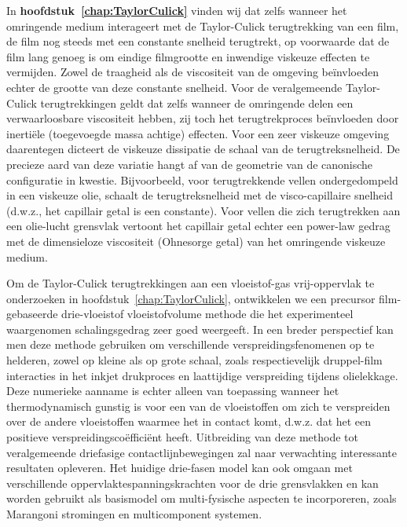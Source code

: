 In \textbf{hoofdstuk~\ref{chap:TaylorCulick}} vinden wij dat zelfs wanneer het omringende medium interageert met de Taylor-Culick terugtrekking van een film, de film nog steeds met een constante snelheid terugtrekt, op voorwaarde dat de film lang genoeg is om eindige filmgrootte en inwendige viskeuze effecten te vermijden.  Zowel de traagheid als de viscositeit van de omgeving beïnvloeden echter de grootte van deze constante snelheid. Voor de veralgemeende Taylor-Culick terugtrekkingen geldt dat zelfs wanneer de omringende delen een verwaarloosbare viscositeit hebben, zij toch het terugtrekproces beïnvloeden door inerti{\"e}le (toegevoegde massa achtige) effecten. Voor een zeer viskeuze omgeving daarentegen dicteert de viskeuze dissipatie de schaal van de terugtreksnelheid. De precieze aard van deze variatie hangt af van de geometrie van de canonische configuratie in kwestie. Bijvoorbeeld, voor terugtrekkende vellen ondergedompeld in een viskeuze olie, schaalt de terugtreksnelheid met de visco-capillaire snelheid (d.w.z., het capillair getal is een constante). Voor vellen die zich terugtrekken aan een olie-lucht grensvlak vertoont het capillair getal echter een power-law gedrag met de dimensieloze viscositeit (Ohnesorge getal) van het omringende viskeuze medium.

Om de Taylor-Culick terugtrekkingen aan een vloeistof-gas vrij-oppervlak te onderzoeken in hoofdstuk~\ref{chap:TaylorCulick}, ontwikkelen we een precursor film-gebaseerde drie-vloeistof vloeistofvolume methode die het experimenteel waargenomen schalingsgedrag zeer goed weergeeft. In een breder perspectief kan men deze methode gebruiken om verschillende verspreidingsfenomenen op te helderen, zowel op kleine als op grote schaal, zoals respectievelijk druppel-film interacties in het inkjet drukproces en laattijdige verspreiding tijdens olielekkage. Deze numerieke aanname is echter alleen van toepassing wanneer het thermodynamisch gunstig is voor een van de vloeistoffen om zich te verspreiden over de andere vloeistoffen waarmee het in contact komt, d.w.z. dat het een positieve verspreidingscoëfficiënt heeft. Uitbreiding van deze methode tot veralgemeende driefasige contactlijnbewegingen zal naar verwachting interessante resultaten opleveren. Het huidige drie-fasen model kan ook omgaan met verschillende oppervlaktespanningskrachten voor de drie grensvlakken en kan worden gebruikt als basismodel om multi-fysische aspecten te incorporeren, zoals Marangoni stromingen en multicomponent systemen.


